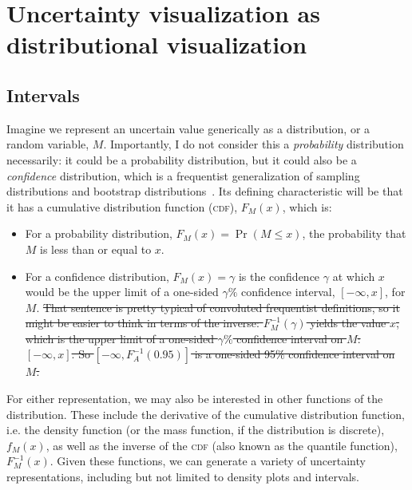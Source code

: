 \documentclass[journal]{vgtc}                     %
\providecommand{\DIFdel}[1]{{\protect\color{red}\sout{#1}}}                      %
\providecommand{\DIFdelbegin}{} %
\providecommand{\DIFdelend}{} %
\begin{document}
\section{Uncertainty visualization as\\distributional visualization}

\subsection{Intervals}

Imagine we represent an uncertain value generically as a distribution, or a random variable, $M$. Importantly, I do not consider this a \textit{probability} distribution necessarily: it could be a probability distribution, but it could also be a \textit{confidence} distribution, which is a frequentist generalization of sampling distributions and bootstrap distributions~\cite{xie2013confidence}. Its defining characteristic will be that it has a cumulative distribution function (\textsc{cdf}), $F_M(x)$, which is:
\begin{itemize}
    \item For a probability distribution, $F_M(x) = \Pr(M \le x)$, the probability that $M$ is less than or equal to $x$.
    \item   For a confidence distribution, $F_M(x) = \gamma$  is the confidence $\gamma$ at which $x$ would be the upper limit of a one-sided $\gamma\%$ confidence interval, $[-\infty, x]$, for $M$. \DIFdelbegin \DIFdel{That sentence is pretty typical of convoluted frequentist definitions, so it might be easier to think in terms of the inverse: $F_M^{-1}(\gamma)$ yields the value $x$, which is the upper limit of a one-sided $\gamma\%$ confidence interval on $M$: $[-\infty,x]$. So $[-\infty, F_A^{-1}(0.95)]$ is a one-sided 95\% confidence interval on $M$.
}\DIFdelend %
\end{itemize}

For either representation, we may also be interested in other functions of the distribution. These include the derivative of the cumulative distribution function, i.e. the density function (or the mass function, if the distribution is discrete), $f_M(x)$, as well as the inverse of the \textsc{cdf} (also known as the quantile function), $F_M^{-1}(x)$. Given these functions, we can generate a variety of uncertainty representations, including but not limited to density plots and intervals.
\end{document}
